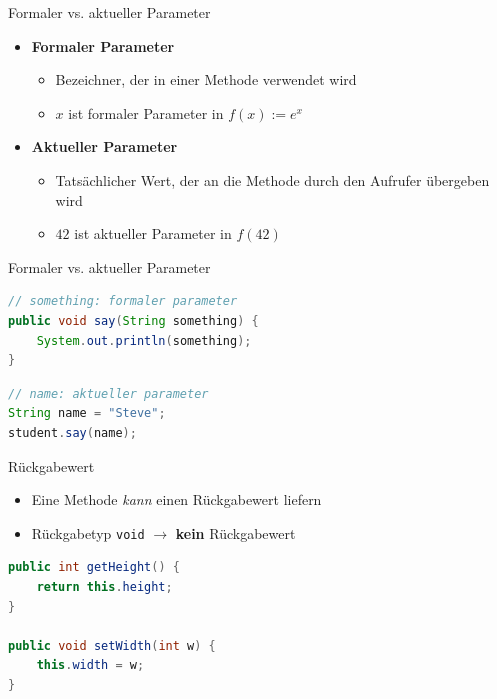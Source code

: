 \documentclass[18pt]{beamer}
\begin{document}
\begin{frame}{Formaler vs. aktueller Parameter}
    \begin{itemize}
        \item \textbf{Formaler Parameter}
        \begin{itemize}
            \item Bezeichner, der in einer Methode verwendet wird
            \item $x$ ist formaler Parameter in $f(x) := e^x$
        \end{itemize}
        \vspace{.2in}
        \item \textbf{Aktueller Parameter}
        \begin{itemize}
            \item Tatsächlicher Wert, der an die Methode durch den Aufrufer übergeben wird
            \item $42$ ist aktueller Parameter in $f(42)$
        \end{itemize}
    \end{itemize}
\end{frame}

\begin{frame}[fragile]{Formaler vs. aktueller Parameter}
    \begin{exampleblock}{}
        \begin{lstlisting}[language=Java]
// something: formaler parameter
public void say(String something) {
    System.out.println(something);
}
        \end{lstlisting}
    \end{exampleblock}
    \begin{exampleblock}{}
        \begin{lstlisting}[language=Java]
// name: aktueller parameter
String name = "Steve";
student.say(name);
        \end{lstlisting}
    \end{exampleblock}
\end{frame}

\begin{frame}[fragile]{Rückgabewert}
    \begin{itemize}
        \item Eine Methode \textit{kann} einen Rückgabewert liefern
        \item Rückgabetyp \texttt{void} $\rightarrow$ \textbf{kein} Rückgabewert
    \end{itemize}
    \begin{exampleblock}{}
        \begin{lstlisting}[language=Java]
public int getHeight() {
    return this.height;
}

public void setWidth(int w) {
    this.width = w;
}
        \end{lstlisting}
    \end{exampleblock}
\end{frame}
\end{document}
